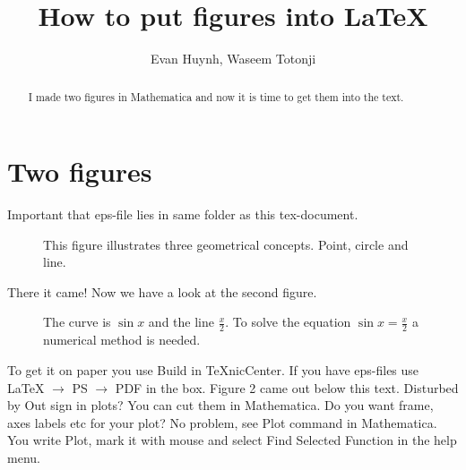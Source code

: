 \documentclass[11pt,a4paper]{article}
\begin{document}
\title{How to put figures into LaTeX}
\author{Evan Huynh, Waseem Totonji}
\maketitle

\begin{abstract}
 I made two figures in Mathematica and now it is time to get
 them into the text.
\end{abstract}



\section{Two figures}

Important that eps-file lies in same folder as this tex-document.
\begin{figure}[tbph]
\caption{ This figure illustrates three geometrical concepts.
Point, circle and line.}
\end{figure}

There it came! Now we have a look at the second figure.
  
\begin{figure}[tbph]
\caption{ The curve is $\sin x$ and the line $\frac{x}{2}$. To solve
the equation $\sin x = \frac{x}{2}$ a numerical method is needed. 
}
\end{figure}
 
To get it on paper you use Build in TeXnicCenter. If you have eps-files
use LaTeX $\rightarrow$ PS $\rightarrow$ PDF in the box. Figure 2 came out below this text.
Disturbed by Out sign in plots? You can cut them in Mathematica. Do you want frame, axes labels etc
for your plot? No problem, see Plot command in Mathematica. You write Plot, mark it with mouse and select
Find Selected Function in the help menu.
\end{document}
